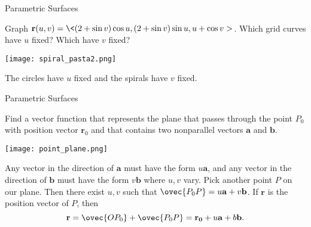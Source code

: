 \documentclass[11pt,english,
handout
]{beamer}
\begin{document}
\begin{frame}[t]{Parametric Surfaces}
\small
\begin{example}
Graph $\mathbf{r}(u,v)=\<(2+\sin v)\cos u,(2+\sin v)\sin u,u+\cos v>$. Which grid curves have $u$ fixed? Which have $v$ fixed? \pause %

\lspace
\begin{minipage}{0.5\textwidth}
\centering
\texttt{[image: spiral\_pasta2.png]}\pause
\end{minipage}%
\begin{minipage}{0.5\textwidth}
The circles have $u$ fixed and the spirals have $v$ fixed.
\end{minipage}
\end{example}
\end{frame}













\begin{frame}[t]{Parametric Surfaces}
\small
\begin{example}
Find a vector function that represents the plane that passes through the point $P_0$ with position vector $\mathbf{r}_0$ and that contains two nonparallel vectors $\mathbf{a}$ and $\mathbf{b}$.

\begin{center}
\texttt{[image: point\_plane.png]}
\end{center}\pause

\lspace
Any vector in the direction of $\mathbf{a}$ must have the form $u\mathbf{a}$, and any vector in the direction of $\mathbf{b}$ must have the form $v\mathbf{b}$ where $u,v$ vary. \pause Pick another point $P$ on our plane. Then there exist $u,v$ such that $\ovec{P_0P}=u\mathbf{a}+v\mathbf{b}$. If $\mathbf{r}$ is the position vector of $P$, then
\[
\mathbf{r}=\ovec{OP_0}+\ovec{P_0P}=\mathbf{r_0}+u\mathbf{a}+b\mathbf{b}.
\]
\end{example}
\end{frame}
\end{document}
